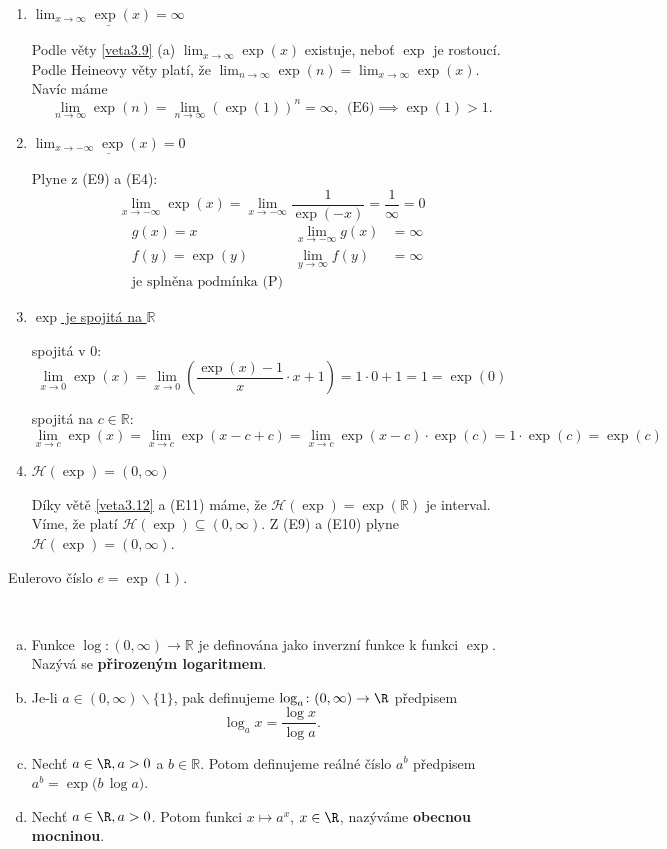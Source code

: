\begin{enumerate}
$$	$$
	\item[(E9)] $\underline{\lim_{x \to \infty} \exp(x)=\infty}$
	\par Podle věty \ref{veta3.9} (a) %
	$\lim_{x \to \infty} \exp(x)$ existuje, neboť $\exp$ je rostoucí. Podle Heineovy věty
	platí, že $\lim_{n \to \infty} \exp(n)=\lim_{x \to \infty} \exp(x)$. Navíc máme
	$$
	    \lim_{n \to \infty} \exp(n)=\lim_{n \to \infty} (\exp(1))^n = \infty, \,\,\,\textrm{(E6)} \implies \exp(1) > 1.
	$$
	\item[(E10)] $\underline{\lim_{x \to -\infty} \exp(x)=0}$
	\par Plyne z (E9) a (E4):
	$$
    \lim_{x \to -\infty} \exp(x)=\lim_{x \to -\infty} \frac{1}{\exp(-x)}=\frac{1}{\infty}=0
	$$
	\begin{align*}
		&g(x) = x & \lim_{x \to -\infty} g(x)&=\infty \\
		&f(y) = \exp(y) & \lim_{y \to \infty} f(y)&=\infty \\
		&\textrm{je splněna podmínka (P)}
	\end{align*}
	\item[(E11)] \underline{$\exp$ je spojitá na $\mathbb R$}
	\par spojitá v 0:
	$$
    \lim_{x \to 0} \exp(x) = \lim_{x\to 0} \left( \frac{\exp(x)-1}{x}\cdot x+1 \right ) = 1\cdot 0 + 1= 1=\exp(0)
	$$
	\par spojitá na $c\in \mathbb R $:
	$$
        \lim_{x \to c} \exp(x) = \lim_{x\to c} \exp(x-c+c) = \lim_{x \to c} \exp(x-c)\cdot \exp(c)=1 \cdot \exp(c) = \exp(c)
	$$
	\item[(E12)] \underline{$\mathcal H(\exp)=(0,\infty)$}
	\par Díky větě \ref{veta3.12} a (E11) máme, že $\mathcal H(\exp)=\exp(\mathbb R )$ je interval.
	Víme, že platí $\mathcal H(\exp)\subseteq (0,\infty)$. Z (E9) a (E10) plyne $\mathcal H(\exp)=(0,\infty)$.
\end{enumerate}

\begin{oznaceni}
	Eulerovo číslo $e=\exp(1)$.
\end{oznaceni}

\begin{definice}\,
\begin{enumerate}[(a)]
  \item Funkce $\log\colon(0,\infty)\to \mathbb R $ je definována jako inverzní funkce k funkci $\exp$. Nazývá se \textbf{přirozeným logaritmem}.
  \item Je-li $a\in(0,\infty)\smallsetminus\{1\}$, pak definujeme $\log_a\colon(0,\infty)\to\R$ předpisem
  $$\log_a x=\dfrac{\log x}{\log a}.$$
  \item Nechť $a \in \R, a>0$ a $b\in \mathbb R $. Potom definujeme reálné číslo $a^b$ předpisem $a^b=\exp\big(b\,\log a\big)$.
  \item Nechť $a\in \R, a>0$. Potom funkci $x\mapsto a^x$, $x\in\R$, nazýváme \textbf{obecnou mocninou}.
\end{enumerate}
\end{definice}

